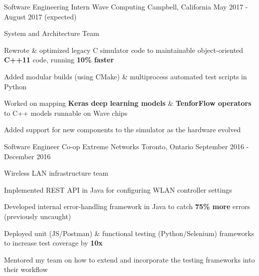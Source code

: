 


\begin{cventries}


\cventry
{Software Engineering Intern}
{Wave Computing}
{Campbell, California}
{May 2017 - August 2017 (expected)}
{ %
System and Architecture Team
\begin{cvitems}
\item[]
\item {Rewrote \& optimized legacy C simulator code to maintainable object-oriented \textbf{C++11} code, running \textbf{10\% faster}}
\item {Added modular builds (using CMake) \& multiprocess automated test scripts in Python}
\item {Worked on mapping \textbf{Keras deep learning models} \& \textbf{TenforFlow operators} to C++ models runnable on Wave chips}
\item {Added support for new components to the simulator as the hardware evolved}
\end{cvitems}
}


\cventry
{Software Engineer Co-op}
{Extreme Networks}
{Toronto, Ontario}
{September 2016 - December 2016}
{ %
Wireless LAN infrastructure team
\begin{cvitems}
\item[]
\item {Implemented REST API in Java for configuring WLAN controller settings}
\item {Developed internal error-handling framework in Java to catch \textbf{75\% more} errors (previously uncaught)}
\item {Deployed unit (JS/Postman) \& functional testing (Python/Selenium) frameworks to increase test coverage by \textbf{10x}}
\item {Mentored my team on how to extend and incorporate the testing frameworks into their workflow}
\end{cvitems}
}


\end{cventries}
